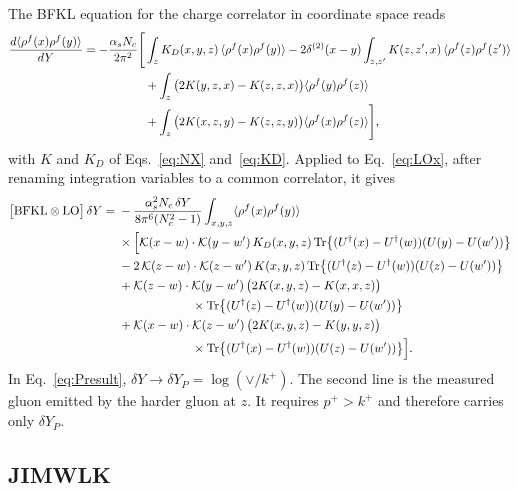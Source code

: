 The BFKL equation for the charge correlator in coordinate space reads
\begin{align}
\frac{d\langle\rho^f(x)\rho^f(y)\rangle}{dY}=-\frac{\alpha_sN_c}{2\pi^2}\Bigg[&\int_zK_D(x,y,z)\,\langle\rho^f(x)\rho^f(y)\rangle-2\delta^{(2)}(x-y)\int_{z,z'}K(z,z',x)\,\langle\rho^f(z)\rho^f(z')\rangle\notag\\
&+\int_z\big(2K(y,z,x)-K(z,z,x)\big)\langle\rho^f(y)\rho^f(z)\rangle\notag\\
&+\int_z\big(2K(x,z,y)-K(z,z,y)\big)\langle\rho^f(x)\rho^f(z)\rangle\Bigg],
\label{eq:vBFKL}
\end{align}
with $K$ and $K_D$ of Eqs.~\eqref{eq:NX} and~\eqref{eq:KD}. Applied to Eq.~\eqref{eq:LOx}, after renaming integration variables to a common correlator, it gives
\begin{align}
\big[{\rm BFKL}\otimes{\rm LO}\big]\,\delta Y={}&-\frac{\alpha_s^2N_c\,\delta Y}{8\pi^6(N_c^2-1)}\int_{x,y,z}\langle\rho^f(x)\rho^f(y)\rangle\notag\\
&\times\Big[\mathcal{K}(x-w)\cdot\mathcal{K}(y-w')\,K_D(x,y,z)\,\mathrm{Tr}\big\{(U^{\dagger}(x)-U^{\dagger}(w))(U(y)-U(w'))\big\}\notag\\
&-2\,\mathcal{K}(z-w)\cdot\mathcal{K}(z-w')\,K(x,y,z)\,\mathrm{Tr}\big\{(U^{\dagger}(z)-U^{\dagger}(w))(U(z)-U(w'))\big\}\notag\\
&+\mathcal{K}(z-w)\cdot\mathcal{K}(y-w')\,\big(2K(x,y,z)-K(x,x,z)\big)\notag\\
&\hspace{6em}\times\mathrm{Tr}\big\{(U^{\dagger}(z)-U^{\dagger}(w))(U(y)-U(w'))\big\}\notag\\
&+\mathcal{K}(x-w)\cdot\mathcal{K}(z-w')\,\big(2K(x,y,z)-K(y,y,z)\big)\notag\\
&\hspace{6em}\times\mathrm{Tr}\big\{(U^{\dagger}(x)-U^{\dagger}(w))(U(z)-U(w'))\big\}\Big].
\label{eq:LOBFKL}
\end{align}
In Eq.~\eqref{eq:Presult}, $\delta Y\to\delta Y_P=\log(\vee/k^+)$. The second line is the measured gluon emitted by the harder gluon at $z$. It requires $p^+>k^+$ and therefore carries only $\delta Y_P$.

\subsection{JIMWLK}

